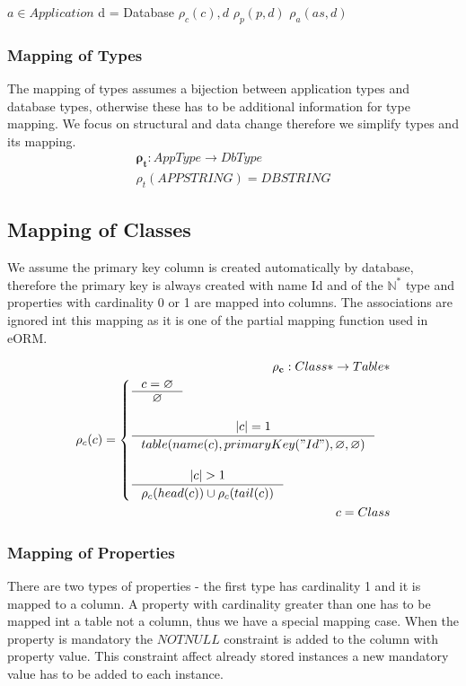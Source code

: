 \documentclass[11pt]{article}
\begin{document}
\begin{algorithmic}[1]
	\Require $a \in Application$
	\State d = Database
		\State $\rho_c(c), d$
			\State $\rho_p(p, d)$
		\EndFor
	 \EndFor
			\State $\rho_{a}(as, d)$
		\EndFor
	\EndFor
\end{algorithmic}


\subsubsection{Mapping of Types}
The mapping of types assumes a bijection between application types and database types, otherwise these has to be additional information for type mapping. We focus on structural and data change therefore we simplify types and its mapping.
\begin{align*}
	\mathbf{\rho_{t}} : AppType \rightarrow DbType  \\
 	\rho_{t}(APPSTRING) = DBSTRING 
\end{align*}


\subsection{Mapping of Classes}
We assume the primary key column is created automatically by database, therefore the primary key is always created with name Id and of the $\mathbb{N^{*}}$ type and properties with cardinality 0 or 1 are mapped into columns. The associations are ignored int this mapping as it is one of the partial mapping function used in eORM.

\begin{align*}
	\mathbf{\rho_{c}} : Class*  \rightarrow Table* \\
	\rho_{c}(c) = \begin{cases}
		\inference{c = \varnothing}{\varnothing}\\\\
		\inference{|c| = 1}{table(name(c), primaryKey("Id"), \varnothing, \varnothing)}  \\ \\
		\inference{|c| > 1}{\rho_c(head(c)) \cup \rho_c(tail(c))}
 \end{cases}\\
 c = Class
\end{align*}

\subsubsection{Mapping of Properties}
There are two types of properties - the first type has cardinality 1  and it is mapped to a column. A property with cardinality greater than one has to be mapped int a table not a column, thus we have a special mapping case. When the property is mandatory the $NOTNULL$ constraint is added to the column with property value. This constraint affect already stored instances a new mandatory value has to be added to each instance.
\end{document}
